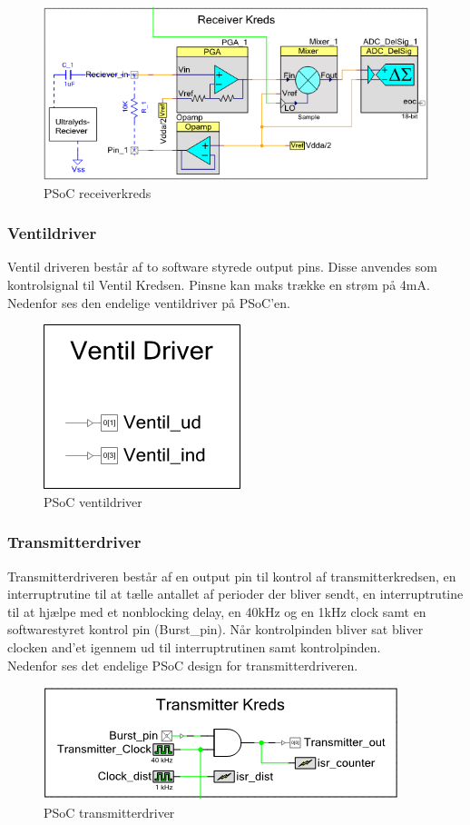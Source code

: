\begin{figure}[H]
\centering
\includegraphics[scale=.75]{billeder/psocreceiverkreds}
\caption{PSoC receiverkreds }
\label{fig:psocreceiverkreds}
\end{figure}
\newpage
\subsubsection{Ventildriver}
Ventil driveren består af to software styrede output pins. Disse anvendes som kontrolsignal til Ventil Kredsen. Pinsne kan maks trække en strøm på 4mA. Nedenfor ses den endelige ventildriver på PSoC'en. 
\begin{figure}[H]
\centering
\includegraphics[scale=.5]{billeder/psocventildriver}
\caption{PSoC ventildriver}
\label{fig:psocventildriver}
\end{figure}

\subsubsection{Transmitterdriver}
Transmitterdriveren består af en output pin til kontrol af transmitterkredsen, en interruptrutine til at tælle antallet af perioder der bliver sendt, en interruptrutine til at hjælpe med et nonblocking delay, en 40kHz og en 1kHz clock samt en softwarestyret kontrol pin (Burst\_pin). Når kontrolpinden bliver sat bliver clocken and'et igennem ud til interruptrutinen samt kontrolpinden. \\
Nedenfor ses det endelige PSoC design for transmitterdriveren.
\begin{figure}[H]
\centering
\includegraphics[scale=.8]{billeder/psoctransmitterdriver}
\caption{PSoC transmitterdriver}
\label{fig:psoctransmitterdriver}
\end{figure}
\newpage
